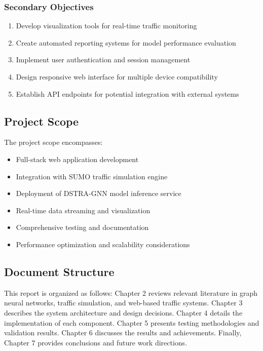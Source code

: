 \subsubsection{Secondary Objectives}
\begin{enumerate}
    \item Develop visualization tools for real-time traffic monitoring
    \item Create automated reporting systems for model performance evaluation
    \item Implement user authentication and session management
    \item Design responsive web interface for multiple device compatibility
    \item Establish API endpoints for potential integration with external systems
\end{enumerate}

\subsection{Project Scope}

The project scope encompasses:
\begin{itemize}
    \item Full-stack web application development
    \item Integration with SUMO traffic simulation engine
    \item Deployment of DSTRA-GNN model inference service
    \item Real-time data streaming and visualization
    \item Comprehensive testing and documentation
    \item Performance optimization and scalability considerations
\end{itemize}

\subsection{Document Structure}

This report is organized as follows: Chapter 2 reviews relevant literature in graph neural networks, traffic simulation, and web-based traffic systems. Chapter 3 describes the system architecture and design decisions. Chapter 4 details the implementation of each component. Chapter 5 presents testing methodologies and validation results. Chapter 6 discusses the results and achievements. Finally, Chapter 7 provides conclusions and future work directions.

